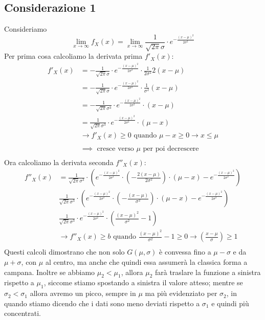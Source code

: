 \documentclass[11pt]{report}
\begin{document}
\subsection{Considerazione 1}
Consideriamo
\begin{equation}
    \lim_{x\rightarrow\infty} f_X(x) = \lim_{x\rightarrow\infty} \frac{1}{\sqrt{2\pi}\sigma} \cdot e^{-\frac{(x-\mu)^2}{2\sigma^2}}
\end{equation}
Per prima cosa calcoliamo la derivata prima $f'_X(x)$:
\begin{equation}
    \begin{split}
        f'_X(x) & = -\frac{1}{\sqrt{2\pi}\sigma} \cdot e^{-\frac{(x-\mu)^2}{2\sigma^2}} \cdot \frac{1}{2\sigma^2}2(x-\mu)\\
        & = -\frac{1}{\sqrt{2\pi}\sigma} \cdot e^{-\frac{(x-\mu)^2}{2\sigma^2}} \cdot \frac{1}{\sigma^2}(x-\mu)\\
        & = -\frac{1}{\sqrt{2\pi}\sigma^3} \cdot e^{-\frac{(x-\mu)^2}{2\sigma^2}} \cdot (x-\mu)\\
        & = \frac{1}{\sqrt{2\pi}\sigma^3} \cdot e^{-\frac{(x-\mu)^2}{2\sigma^2}} \cdot (\mu-x)\\
        & \rightarrow f'_X(x) \geq 0 \text{ quando } \mu-x \geq 0 \rightarrow x \leq \mu\\
        \\
        & \implies \text{ cresce verso } \mu \text{ per poi decrescere}\\
    \end{split}
\end{equation}
Ora calcoliamo la derivata seconda $f''_X(x)$:
\begin{equation}
    \begin{split}
        f''_X(x) & = \frac{1}{\sqrt{2\pi}\sigma^3} \cdot \left( e^{-\frac{(x-\mu)^2}{2\sigma^2}} \cdot \left( -\frac{2(x-\mu)}{2\sigma^2} \right) \cdot (\mu-x) - e^{-\frac{(x-\mu)^2}{2\sigma^2}} \right)\\
        & \frac{1}{\sqrt{2\pi}\sigma^3} \cdot \left( e^{-\frac{(x-\mu)^2}{2\sigma^2}} \cdot \left( -\frac{(x-\mu)}{\sigma^2} \right) \cdot (\mu-x) - e^{-\frac{(x-\mu)^2}{2\sigma^2}} \right)\\
        & \frac{1}{\sqrt{2\pi}\sigma^3} \cdot e^{-\frac{(x-\mu)^2}{2\sigma^2}} \cdot \left( \frac{(x-\mu)^2}{\sigma^2} - 1 \right)\\
        & \rightarrow f''_X(x) \geq b \text{ quando } \frac{(x-\mu)^2}{\sigma^2} - 1 \geq 0 \rightarrow \left( \frac{x-\mu}{\sigma} \right) \geq 1\\
    \end{split}
\end{equation}
Questi calcoli dimostrano che non solo $G(\mu,\sigma)$ è convessa fino a $\mu-\sigma$ e da $\mu+\sigma$, con $\mu$ al centro, ma anche che quindi essa assumerà la classica forma a campana. Inoltre se abbiamo $\mu_2 < \mu_1$, allora $\mu_2$ farà traslare la funzione a sinistra rispetto a $\mu_1$, siccome stiamo spostando a sinistra il valore atteso; mentre se $\sigma_2 < \sigma_1$ allora avremo un picco, sempre in $\mu$ ma più evidenziato per $\sigma_2$, in quando stiamo dicendo che i dati sono meno deviati rispetto a $\sigma_1$ e quindi più concentrati.
\end{document}
